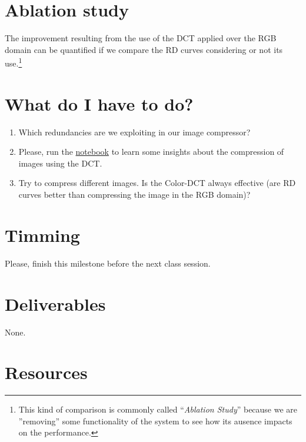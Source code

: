 \section{Ablation study}
The improvement resulting from the use of the DCT applied over the RGB
domain can be quantified if we compare the RD curves considering or
not its use.\footnote{This kind of comparison is commonly called
``\emph{Ablation Study}'' because we are ''removing'' some
functionality of the system to see how its ausence impacts on the
performance.} 

\section{What do I have to do?}

\begin{enumerate}
\item Which redundancies are we exploiting in our image compressor?
\item Please, run the
  \href{https://github.com/Sistemas-Multimedia/Sistemas-Multimedia.github.io/blob/master/contents/RGB_DCT/RGB_DCT.ipynb}{notebook}
  to learn some insights about the compression of images using the
  DCT.
\item Try to compress different images. Is the Color-DCT always
  effective (are RD curves better than compressing the image in
  the RGB domain)?
\end{enumerate}

\section{Timming}

Please, finish this milestone before the next class session.

\section{Deliverables}

None.

\section{Resources}

\renewcommand{\addcontentsline}[3]{}%



